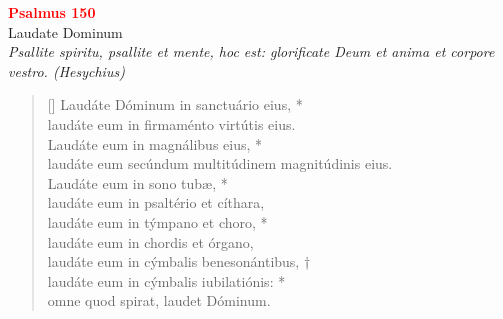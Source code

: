 


\def\greinitialformat#1{%
{\fontsize{39}{39}\selectfont #1}%
}




\vspace{0.3cm}
\begin{center}
 \textcolor{red}{\large \bf Psalmus 150}\\
Laudate Dominum\\
\textit{\small Psallite spiritu, psallite et mente, hoc est: glorificate Deum et anima et corpore vestro. (Hesychius)}
\end{center}
\begin{verse}[\versewidth]
Laudáte Dóminum in sanctuário eius, *\\
laudáte eum in firmaménto virtútis eius.\\
\vin Laudáte eum in magnálibus eius, *\\
\vin laudáte eum secúndum multitúdinem magnitúdinis eius.\\
Laudáte eum in sono tubæ, *\\
laudáte eum in psaltério et cíthara,\\
\vin laudáte eum in týmpano et choro, *\\
\vin laudáte eum in chordis et órgano,\\
laudáte eum in cýmbalis benesonántibus, †\\
laudáte eum in cýmbalis iubilatiónis: *\\
omne quod spirat, laudet Dóminum.\\
\end{verse}
\vspace{1cm}



